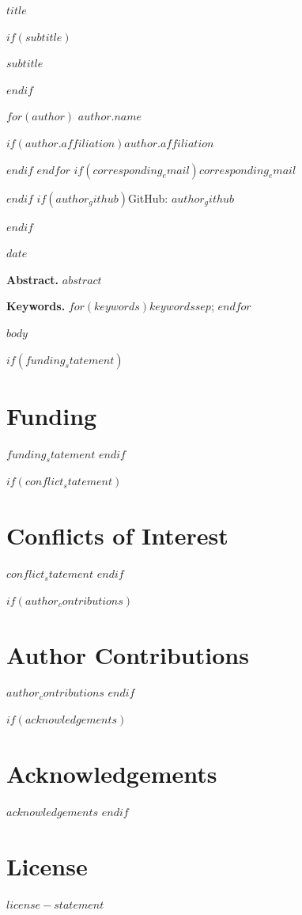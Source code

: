 \documentclass[11pt]{article}
\begin{document}
\begin{center}
{\LARGE\bfseries $title$\par}
$if(subtitle)$
\vspace{0.45em}
{\large $subtitle$\par}
$endif$
\vspace{1.0em}
{\normalsize
$for(author)$
\textbf{$author.name$}\par
$if(author.affiliation)$$author.affiliation$\par$endif$
$endfor$
$if(corresponding_email)$\href{mailto:$corresponding_email$}{$corresponding_email$}\par$endif$
$if(author_github)$GitHub: $author_github$\par$endif$
}
\vspace{0.8em}
{$date$\par}
\end{center}

\vspace{1.1em}
\noindent\textbf{Abstract.}
$abstract$

\vspace{0.8em}
\noindent\textbf{Keywords.}
$for(keywords)$$keywords$$sep$; $endfor$

\vspace{1.0em}

$body$

$if(funding_statement)$
\section*{Funding}
$funding_statement$
$endif$

$if(conflict_statement)$
\section*{Conflicts of Interest}
$conflict_statement$
$endif$

$if(author_contributions)$
\section*{Author Contributions}
$author_contributions$
$endif$

$if(acknowledgements)$
\section*{Acknowledgements}
$acknowledgements$
$endif$

\section*{License}
$license-statement$
\end{document}
